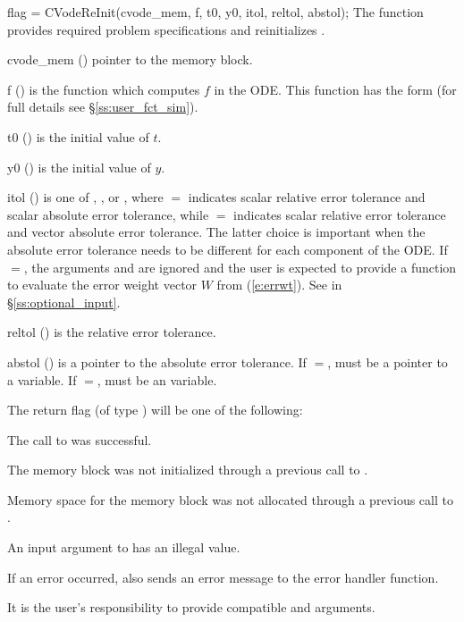 {
  flag = CVodeReInit(cvode\_mem, f, t0, y0, itol, reltol, abstol);
}
{
  The function  provides required problem specifications 
  and reinitializes {\cvode}.
}
{
  \begin{args}
  \item[cvode\_mem] ()
    pointer to the {\cvode} memory block.
  \item[f] ()
    is the {\C} function which computes $f$ in the ODE. This function has the form 
     (for full details see \S\ref{ss:user_fct_sim}).
  \item[t0] ()
    is the initial value of $t$.
  \item[y0] ()
    is the initial value of $y$. 
  \item[itol] () 
    is one of , , or , where $=$ indicates
    scalar relative error tolerance and scalar absolute error tolerance, while
    $=$ indicates scalar relative error tolerance and vector
    absolute error tolerance.  The latter choice is important when the absolute
    error tolerance needs to be different for each component of the ODE. 
    If $=$, the arguments  and  are ignored
    and the user is expected to provide a function to evaluate the error weight vector
    $W$ from (\ref{e:errwt}). See  in \S\ref{ss:optional_input}.
  \item[reltol] ()
    is the relative error tolerance.
  \item[abstol] ()
    is a pointer to the absolute error tolerance. If $=$, 
    must be a pointer to a  variable. If $=$, 
    must be an  variable.
  \end{args}
}
{
  The return flag  (of type ) will be one of the following:
  \begin{args}[CV\_NO\_MALLOC]
  \item[\Id{CV\_SUCCESS}]
    The call to  was successful.
  \item[\Id{CV\_MEM\_NULL}] 
    The {\cvode} memory block was not initialized through a 
    previous call to .
  \item[\Id{CV\_NO\_MALLOC}] 
    Memory space for the {\cvode} memory block was not allocated through a 
    previous call to .
  \item[\Id{CV\_ILL\_INPUT}] 
    An input argument to  has an illegal value.
  \end{args}
}
{
  If an error occurred,  also sends an error message to the
  error handler function.

  {\warn}It is the user's responsibility to provide compatible  and
   arguments.
}

